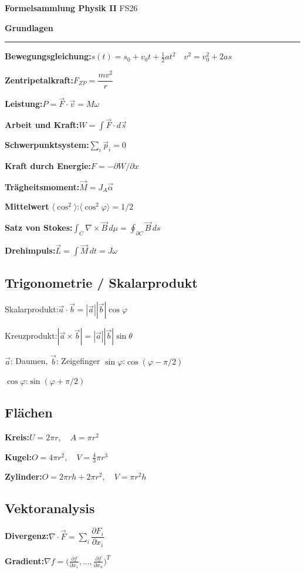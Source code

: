 \documentclass[10pt,a4paper]{article}
\newcommand{\unnsection}[1]{%
  \par\vspace{5pt}%
  {\large\bfseries #1}\par\nobreak\vspace{1pt}%
  \noindent\rule{\linewidth}{0.4pt}\par\vspace{2pt}}
\newcommand{\fl}[2]{%
  \noindent #1\hfill$\displaystyle #2$\par\vspace{1pt}}
\begin{document}
\begin{center}
  {\large\bfseries Formelsammlung Physik II} \quad FS26
\end{center}
\vspace{2pt}
\begin{multicols}{2}

\unnsection{Grundlagen}

\fl{\textbf{Bewegungsgleichung:}}{s(t)=s_0+v_0 t+\tfrac{1}{2}at^2 \quad v^2=v_0^2+2as}
\fl{\textbf{Zentripetalkraft:}}{F_{ZP}=\dfrac{mv^2}{r}}
\fl{\textbf{Leistung:}}{P=\vec{F}\cdot\vec{v}=M\omega}
\fl{\textbf{Arbeit und Kraft:}}{W=\int\vec{F}\cdot d\vec{s}}
\fl{\textbf{Schwerpunktsystem:}}{\sum_i\vec{p}_i=0}
\fl{\textbf{Kraft durch Energie:}}{F=-\partial W/\partial x}

\fl{\textbf{Trägheitsmoment:}}{\vec{M}=J_A\vec{\alpha}}
\fl{\textbf{Mittelwert} $\langle\cos^2\rangle$:}{\langle\cos^2\varphi\rangle=1/2}
\fl{\textbf{Satz von Stokes:}}{\int_C\nabla\times\vec{B}\,d\mu=\oint_{\partial C}\vec{B}\,ds}
\fl{\textbf{Drehimpuls:}}{\vec{L}=\int\vec{M}\,dt=J\omega}

\subsection{Trigonometrie / Skalarprodukt}

\fl{Skalarprodukt:}{\vec{a}\cdot\vec{b}=|\vec{a}||\vec{b}|\cos\varphi}
\fl{Kreuzprodukt:}{|\vec{a}\times\vec{b}|=|\vec{a}||\vec{b}|\sin\theta}
$\vec{a}$: Daumen, $\vec{b}$: Zeigefinger
\fl{$\sin\varphi$:}{\cos(\varphi-\pi/2)}
\fl{$\cos\varphi$:}{\sin(\varphi+\pi/2)}

\subsection{Flächen}

\fl{\textbf{Kreis:}}{U=2\pi r,\quad A=\pi r^2}
\fl{\textbf{Kugel:}}{O=4\pi r^2,\quad V=\tfrac{4}{3}\pi r^3}
\fl{\textbf{Zylinder:}}{O=2\pi rh+2\pi r^2,\quad V=\pi r^2 h}

\subsection{Vektoranalysis}

\fl{\textbf{Divergenz:}}{\nabla\cdot\vec{F}=\sum_i\dfrac{\partial F_i}{\partial x_i}}
\fl{\textbf{Gradient:}}{\nabla f=\bigl(\tfrac{\partial f}{\partial x_1},\ldots,\tfrac{\partial f}{\partial x_n}\bigr)^T}


\end{multicols}
\end{document}
